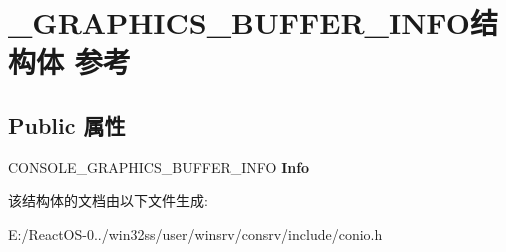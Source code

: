 \hypertarget{struct___g_r_a_p_h_i_c_s___b_u_f_f_e_r___i_n_f_o}{}\section{\+\_\+\+G\+R\+A\+P\+H\+I\+C\+S\+\_\+\+B\+U\+F\+F\+E\+R\+\_\+\+I\+N\+F\+O结构体 参考}
\label{struct___g_r_a_p_h_i_c_s___b_u_f_f_e_r___i_n_f_o}
\subsection*{Public 属性}
\begin{DoxyCompactItemize}
\item 
\mbox{\label{struct___g_r_a_p_h_i_c_s___b_u_f_f_e_r___i_n_f_o_a8b272f02fddeac679fb1c31e15e47144}} 
C\+O\+N\+S\+O\+L\+E\+\_\+\+G\+R\+A\+P\+H\+I\+C\+S\+\_\+\+B\+U\+F\+F\+E\+R\+\_\+\+I\+N\+FO {\bfseries Info}
\end{DoxyCompactItemize}


该结构体的文档由以下文件生成\+:\begin{DoxyCompactItemize}
\item 
E\+:/\+React\+O\+S-\/0../win32ss/user/winsrv/consrv/include/conio.\+h\end{DoxyCompactItemize}
